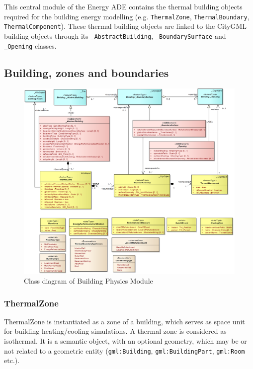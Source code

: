\documentclass[a4paper,12pt]{article}
\begin{document}
This central module of the Energy ADE contains the thermal building
objects required for the building energy modelling (e.g.
\texttt{ThermalZone}, \texttt{ThermalBoundary},
\texttt{ThermalComponent}). These thermal building objects are linked to
the CityGML building objects through its \texttt{\_AbstractBuilding},
\texttt{\_BoundarySurface} and \texttt{\_Opening} classes.

\subsection{Building, zones and
boundaries}\label{building-zones-and-boundaries}

\begin{figure}[htbp]
\centering
\includegraphics{fig/class_geometry.png}
\caption{Class diagram of Building Physics Module}
\end{figure}

\subsubsection{ThermalZone}\label{thermalzone}

ThermalZone is instantiated as a zone of a building, which serves as
space unit for building heating/cooling simulations. A thermal zone is
considered as isothermal. It is a semantic object, with an optional
geometry, which may be or not related to a geometric entity
(\texttt{gml:Building}, \texttt{gml:BuildingPart}, \texttt{gml:Room}
etc.).
\end{document}
